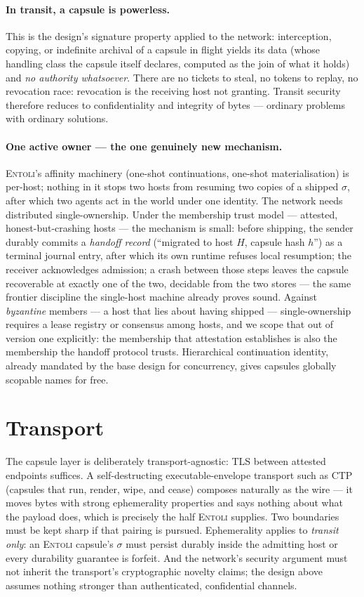 \documentclass[sigplan,10pt]{acmart}
\begin{document}
\paragraph{In transit, a capsule is powerless.} This is the design's
signature property applied to the network: interception, copying, or
indefinite archival of a capsule in flight yields its data (whose
handling class the capsule itself declares, computed as the join of
what it holds) and \emph{no authority whatsoever}. There are no tickets
to steal, no tokens to replay, no revocation race: revocation is the
receiving host not granting. Transit security therefore reduces to
confidentiality and integrity of bytes --- ordinary problems with
ordinary solutions.

\paragraph{One active owner — the one genuinely new mechanism.}
\textsc{Entoli}'s affinity machinery (one-shot continuations, one-shot
materialisation) is per-host; nothing in it stops two hosts from
resuming two copies of a shipped $\sigma$, after which two agents act
in the world under one identity. The network needs distributed
single-ownership. Under the membership trust model --- attested,
honest-but-crashing hosts --- the mechanism is small: before shipping,
the sender durably commits a \emph{handoff record} (``migrated to host
$H$, capsule hash $h$'') as a terminal journal entry, after which its
own runtime refuses local resumption; the receiver acknowledges
admission; a crash between those steps leaves the capsule recoverable
at exactly one of the two, decidable from the two stores --- the same
frontier discipline the single-host machine already proves sound.
Against \emph{byzantine} members --- a host that lies about having
shipped --- single-ownership requires a lease registry or consensus
among hosts, and we scope that out of version one explicitly: the
membership that attestation establishes is also the membership the
handoff protocol trusts. Hierarchical continuation identity, already
mandated by the base design for concurrency, gives capsules globally
scopable names for free.

\section{Transport}

The capsule layer is deliberately transport-agnostic: TLS between
attested endpoints suffices. A self-destructing executable-envelope
transport such as CTP (capsules that run, render, wipe, and cease)
composes naturally as the wire --- it moves bytes with strong
ephemerality properties and says nothing about what the payload does,
which is precisely the half \textsc{Entoli} supplies. Two boundaries
must be kept sharp if that pairing is pursued. Ephemerality applies to
\emph{transit only}: an \textsc{Entoli} capsule's $\sigma$ must persist
durably inside the admitting host or every durability guarantee is
forfeit. And the network's security argument must not inherit the
transport's cryptographic novelty claims; the design above assumes
nothing stronger than authenticated, confidential channels.
\end{document}

